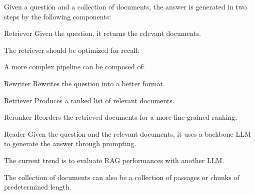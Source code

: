 \begin{description}
    \item[RAG for QA] 
        Given a question and a collection of documents, the answer is generated in two steps by the following components:
        \begin{descriptionlist}
            \item[Retriever] 
                Given the question, it returns the relevant documents.

                \begin{remark}
                    The retriever should be optimized for recall.
                \end{remark}

                \begin{remark}
                    A more complex pipeline can be composed of:
                    \begin{descriptionlist}
                        \item[Rewriter] Rewrites the question into a better format.
                        \item[Retriever] Produces a ranked list of relevant documents.
                        \item[Reranker] Reorders the retrieved documents for a more fine-grained ranking.
                    \end{descriptionlist}
                \end{remark}

            \item[Reader] 
                Given the question and the relevant documents, it uses a backbone LLM to generate the answer through prompting.
        \end{descriptionlist}
\end{description}

\begin{remark}
    The current trend is to evaluate RAG performances with another LLM.
\end{remark}

\begin{remark}
    The collection of documents can also be a collection of passages or chunks of predetermined length.
\end{remark}

